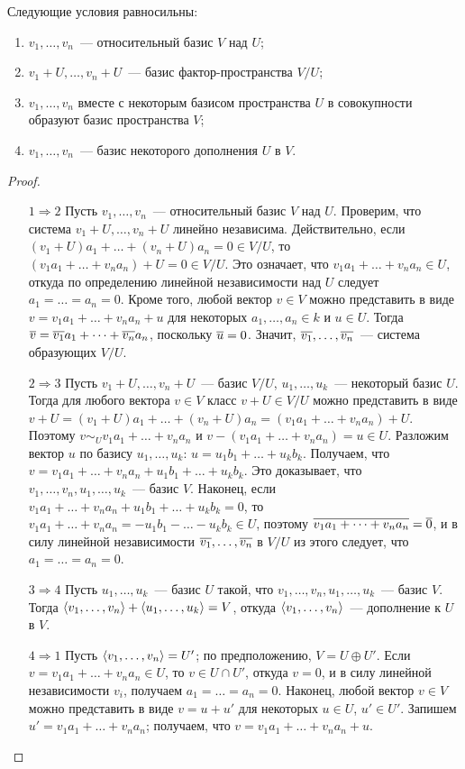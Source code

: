 \begin{theorem}\label{thm_relative_basis}
Следующие условия равносильны:
\begin{enumerate}
\item $v_1,\dots,v_n$~--- относительный базис $V$ над $U$;
\item $v_1+U,\dots,v_n+U$~--- базис фактор-пространства $V/U$;
\item $v_1,\dots,v_n$ вместе с некоторым базисом пространства $U$ в
  совокупности образуют базис пространства $V$;
\item $v_1,\dots,v_n$~--- базис некоторого дополнения $U$ в $V$.
\end{enumerate}
\end{theorem}
\begin{proof}
\begin{itemize}
\item[$1\Rightarrow 2$] Пусть $v_1,\dots,v_n$~--- относительный базис
  $V$ над $U$. Проверим, что система $v_1+U,\dots,v_n+U$ линейно
  независима. Действительно, если
  $(v_1+U)a_1+\dots+(v_n+U)a_n=0\in V/U$,
   то $(v_1a_1+\dots+v_na_n)+U=0\in V/U$.
  Это означает, что $v_1a_1+\dots+v_na_n\in U$, откуда по
  определению линейной независимости над $U$ следует
  $a_1=\dots=a_n=0$.
  Кроме того, любой вектор $v\in V$ можно представить в виде
  $v = v_1a_1+\dots+v_na_n+u$ для некоторых
  $a_1,\dots,a_n\in k$ и $u\in U$. Тогда
  $\overline{v}=\overline{v_1}a_1 + \dots + \overline{v_n}a_n$, поскольку
  $\overline{u}=0$. Значит, $\overline{v_1},\dots,\overline{v_n}$~--- система образующих
  $V/U$.
\item[$2\Rightarrow 3$] Пусть $v_1+U,\dots,v_n+U$~--- базис $V/U$,
  $u_1,\dots,u_k$~--- некоторый базис $U$. Тогда для любого вектора
  $v\in V$ класс $v+U\in V/U$ можно представить в виде
  $v+U=(v_1+U)a_1 + \dots + (v_n+U)a_n = (v_1a_1 +
  \dots + v_na_n) + U$. Поэтому $v\sim_U v_1a_1 + \dots +
  v_na_n$ и $v-(v_1a_1+\dots+v_na_n) = u\in
  U$. Разложим вектор $u$ по базису $u_1,\dots,u_k$:
  $u = u_1b_1 + \dots + u_kb_k$. Получаем, что
  $v = v_1a_1 + \dots + v_na_n + u_1b_1 + \dots +
  u_kb_k$.
  Это доказывает, что $v_1,\dots,v_n,u_1,\dots,u_k$~--- базис $V$.
  Наконец, если $v_1a_1 + \dots + v_na_n + u_1b_1 +
  \dots + u_kb_k = 0$, то $v_1a_1 + \dots + v_na_n =
  -u_1b_1 - \dots - u_kb_k\in U$, поэтому
  $\overline{v_1a_1 + \dots + v_na_n} = \overline{0}$, и в силу
  линейной независимости $\overline{v_1},\dots,\overline{v_n}$ в $V/U$ из этого
  следует, что $a_1 = \dots = a_n = 0$.
\item[$3\Rightarrow 4$] Пусть $u_1,\dots,u_k$~--- базис $U$ такой, что
  $v_1,\dots,v_n,u_1,\dots,u_k$~--- базис $V$. Тогда
  $\langle v_1,\dots,v_n\rangle + \langle u_1,\dots,u_k\rangle = V$, откуда
  $\langle v_1,\dots,v_n\rangle$~--- дополнение к $U$ в $V$.
\item[$4\Rightarrow 1$] Пусть $\langle v_1,\dots,v_n\rangle=U'$; по
  предположению, $V=U\oplus U'$. Если $v = v_1a_1 + \dots +
  v_na_n\in U$, то $v\in U\cap U'$, откуда $v=0$, и в силу
  линейной независимости $v_i$, получаем $a_1 = \dots =
  a_n = 0$.
  Наконец, любой вектор $v\in V$ можно представить в виде $v=u+u'$ для
  некоторых $u\in U$, $u'\in U'$. Запишем $u' = v_1a_1 + \dots +
  v_na_n$; получаем, что $v = v_1a_1 + \dots +
  v_na_n + u$.
\end{itemize}
\end{proof}

